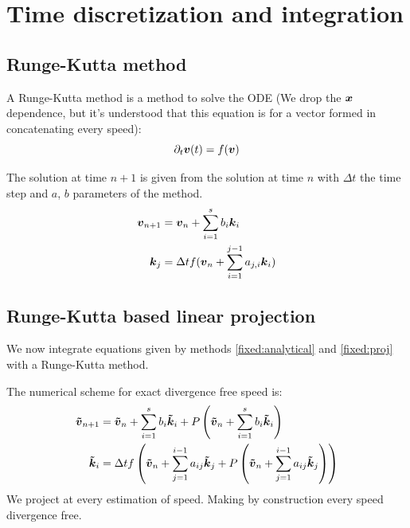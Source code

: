 \section{Time discretization and integration}
\label{fixed:timesec}
\subsection{Runge-Kutta method}

A Runge-Kutta method is a method to solve the ODE (We drop the ${\boldsymbol {x}}$ dependence, but it's understood that this equation is for a vector formed in concatenating every speed):
\begin{equation}
\partial_t {\boldsymbol {v}}(t)=f({\boldsymbol {v}})
\end{equation}

The solution at time $n+1$ is given from the solution at time $n$ with $\Delta t$ the time step and $a$, $b$ parameters of the method.
\begin{subequations}
\begin{align}
	{\boldsymbol {v}}_{n+1}&={\boldsymbol {v}}_{n}+\sum_{i=1}^{s}b_{i}{\boldsymbol {k}}_{i}\\
	{\boldsymbol {k}}_{j}&=\Delta t f({\boldsymbol {v}}_{n}+\sum_{i=1}^{j-1}a_{j,i}{\boldsymbol {k}}_{i})
\end{align}
\end{subequations}

\subsection{Runge-Kutta based linear projection}
\label{fixed:sect:runge-kutta}
We now integrate equations given by methods \ref{fixed:analytical} and \ref{fixed:proj} with a Runge-Kutta method.

The numerical scheme for exact divergence free speed is:
\begin{subequations}
\begin{align}
{\boldsymbol {\tilde{v}}}_{n+1}&={\boldsymbol {\tilde{v}}}_{n}+\sum_{i=1}^{s}b_{i}{\boldsymbol {\tilde{k}}}_{i}+P\left({\boldsymbol {\tilde{v}}}_{n}+\sum_{i=1}^{s}b_{i}{\boldsymbol {\tilde{k}}}_{i}\right)\\
{\boldsymbol {\tilde{k}}}_{i}&=\Delta t f\left({\boldsymbol {\tilde{v}}}_{n}+\sum_{j=1}^{i-1}a_{ij}{\boldsymbol {\tilde{k}}}_{j}+P\left({\boldsymbol {\tilde{v}}}_{n}+\sum_{j=1}^{i-1}a_{ij}{\boldsymbol {\tilde{k}}}_{j}\right)\right)
\end{align}
\end{subequations}
We project at every estimation of speed. Making by construction every speed divergence free.

